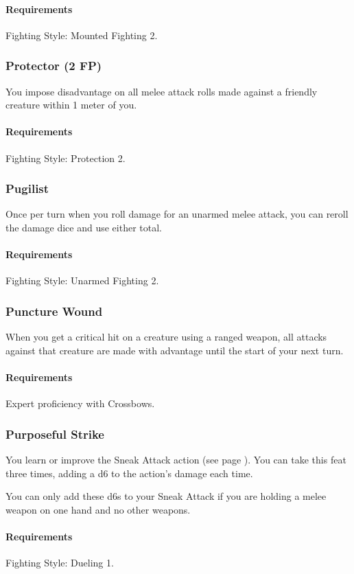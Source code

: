     \paragraph{Requirements} Fighting Style: Mounted Fighting 2.
\subsubsection{Protector (2 FP)} \label{feat::protector}
    You impose disadvantage on all melee attack rolls made against a friendly creature within 1 meter of you.
    \paragraph{Requirements} Fighting Style: Protection 2.
\subsubsection{Pugilist} \label{feat::pugilist}
    Once per turn when you roll damage for an unarmed melee attack, you can reroll the damage dice and use either total.
    \paragraph{Requirements} Fighting Style: Unarmed Fighting 2.
\subsubsection{Puncture Wound} \label{feat::puncturewound}
    When you get a critical hit on a creature using a ranged weapon, all attacks against that creature are made with advantage until the start of your next turn.
    \paragraph{Requirements} Expert proficiency with Crossbows.
\subsubsection{Purposeful Strike} \label{feat::purposefulstrike}
    You learn or improve the Sneak Attack action (see page \pageref{act::sneakattack}).
    You can take this feat three times, adding a d6 to the action's damage each time.

    You can only add these d6s to your Sneak Attack if you are holding a melee weapon on one hand and no other weapons.
    \paragraph{Requirements} Fighting Style: Dueling 1.
